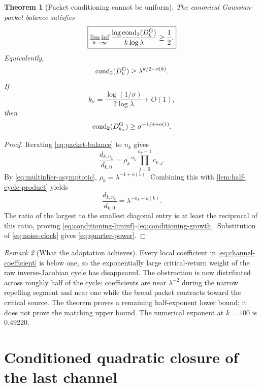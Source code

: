 \documentclass[11pt]{article}
\newtheorem{theorem}{Theorem}[section]
\theoremstyle{definition}
\theoremstyle{remark}
\newtheorem{remark}[theorem]{Remark}
\newcommand{\cond}{\operatorname{cond}_2}
\begin{document}
\begin{theorem}[Packet conditioning cannot be uniform]
\label{thm:packet-conditioning}
The canonical Gaussian-packet balance satisfies
\begin{equation}\label{eq:conditioning-liminf}
 \boxed{
 \liminf_{k\to\infty}
 \frac{\log\cond(D_k^{\rm G})}{k\log\lambda}
 \ge\frac12.}
\end{equation}
Equivalently,
\begin{equation}\label{eq:conditioning-growth}
 \cond(D_k^{\rm G})\ge\lambda^{k/2-o(k)}.
\end{equation}
If
\begin{equation}\label{eq:noise-clock}
 k_\sigma=\frac{\log(1/\sigma)}{2\log\lambda}+O(1),
\end{equation}
then
\begin{equation}\label{eq:quarter-power}
 \cond(D_{k_\sigma}^{\rm G})
 \ge\sigma^{-1/4+o(1)}.
\end{equation}
\end{theorem}

\begin{proof}
Iterating \eqref{eq:packet-balance} to $n_k$ gives
\[
 \frac{d_{k,n_k}}{d_{k,0}}
 =\rho_k^{-n_k}\prod_{j=0}^{n_k-1}c_{k,j}.
\]
By \eqref{eq:multiplier-asymptotic},
$\rho_k=\lambda^{-1+o(1)}$.  Combining this with
\cref{lem:half-cycle-product} yields
\[
 \frac{d_{k,n_k}}{d_{k,0}}
 =\lambda^{-n_k+o(k)}.
\]
The ratio of the largest to the smallest diagonal entry is at least the
reciprocal of this ratio, proving
\eqref{eq:conditioning-liminf}--\eqref{eq:conditioning-growth}.  Substitution
of \eqref{eq:noise-clock} gives \eqref{eq:quarter-power}.
\end{proof}

\begin{remark}[What the adaptation achieves]
\label{rem:conditioning-interpretation}
Every local coefficient in \eqref{eq:channel-coefficient} is below one, so
the exponentially large critical-return weight of the raw inverse-Jacobian
cycle has disappeared.  The obstruction is now distributed across roughly
half of the cycle: coefficients are near $\lambda^{-2}$ during the narrow
repelling segment and near one while the broad packet contracts toward the
critical source.  The theorem proves a remaining half-exponent lower bound;
it does not prove the matching upper bound.  The numerical exponent at
$k=100$ is $0.49220$.
\end{remark}

\section{Conditioned quadratic closure of the last channel}
\label{sec:critical-closure}
\end{document}
